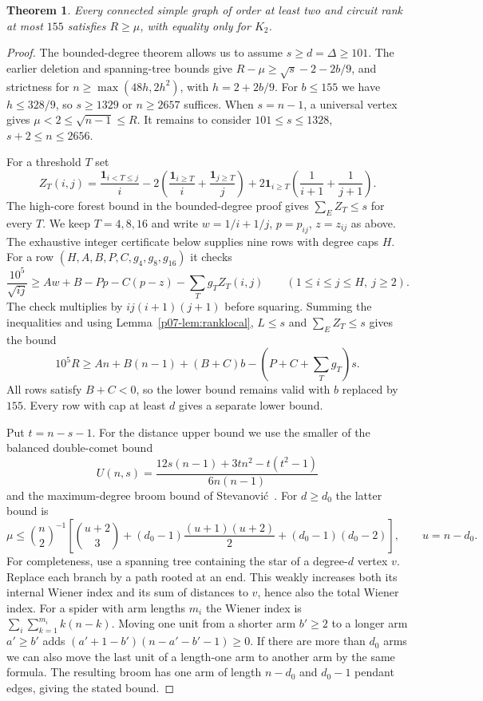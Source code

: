 \documentclass[11pt,a4paper]{article}
\newtheorem{theorem}{Theorem}[section]
\begin{document}
\begin{theorem}\label{p07-thm:cycl155}
Every connected simple graph of order at least two and circuit rank
at most $155$ satisfies $R\ge\mu$, with equality only for $K_2$.
\end{theorem}
\begin{proof}
The bounded-degree theorem allows us to assume $s\ge d=\Delta\ge101$.
The earlier deletion and spanning-tree bounds give
$R-\mu\ge\sqrt{s}-2-2b/9$, and strictness for
$n\ge\max(48h,2h^2)$, with $h=2+2b/9$. For $b\le155$ we have
$h\le328/9$, so $s\ge1329$ or $n\ge2657$ suffices. When $s=n-1$,
a universal vertex gives $\mu<2\le\sqrt{n-1}\le R$.
It remains to consider $101\le s\le1328$, $s+2\le n\le2656$.

For a threshold $T$ set
\[
 Z_T(i,j)=\frac{\mathbf1_{i<T\le j}}i
 -2\left(\frac{\mathbf1_{i\ge T}}i+\frac{\mathbf1_{j\ge T}}j\right)
 +2\mathbf1_{i\ge T}\left(\frac1{i+1}+\frac1{j+1}\right).
\]
The high-core forest bound in the bounded-degree proof gives
$\sum_E Z_T\le s$ for every $T$. We keep $T=4,8,16$ and
write $w=1/i+1/j$, $p=p_{ij}$, $z=z_{ij}$ as above.
The exhaustive integer certificate below supplies nine rows with degree
caps $H$. For a row $(H,A,B,P,C,g_4,g_8,g_{16})$ it checks
\[
 \frac{10^5}{\sqrt{ij}}\ge
 Aw+B-Pp-C(p-z)-\sum_T g_T Z_T(i,j)
 \qquad(1\le i\le j\le H,\ j\ge2).
\]
The check multiplies by $ij(i+1)(j+1)$ before squaring.
Summing the inequalities and using Lemma~\ref{p07-lem:ranklocal},
$L\le s$ and $\sum_E Z_T\le s$ gives the bound
\[
 10^5R\ge An+B(n-1)+(B+C)b-(P+C+\textstyle\sum_Tg_T)s .
\]
All rows satisfy $B+C<0$, so the lower bound remains valid with
$b$ replaced by $155$. Every row with cap at least $d$ gives a separate
lower bound.

Put $t=n-s-1$. For the distance upper bound we use the smaller
of the balanced double-comet bound
\[
 U(n,s)=\frac{12s(n-1)+3tn^2-t(t^2-1)}{6n(n-1)}
\]
and the maximum-degree broom bound of Stevanovi\'c~\cite{p07-Stev}.
For $d\ge d_0$ the latter bound is
\[
 \mu\le\binom n2^{-1}\left[
   \binom{u+2}{3}+(d_0-1)\frac{(u+1)(u+2)}2+(d_0-1)(d_0-2)\right],
 \qquad u=n-d_0 .
\]
For completeness, use a spanning tree containing the star of a
degree-$d$ vertex $v$. Replace each branch by a path rooted at an end.
This weakly increases both its internal Wiener index and its sum of
distances to $v$, hence also the total Wiener index. For a spider with
arm lengths $m_i$ the Wiener index is $\sum_i\sum_{k=1}^{m_i}k(n-k)$.
Moving one unit from a shorter arm $b'\ge2$ to a longer arm $a'\ge b'$
adds $(a'+1-b')(n-a'-b'-1)\ge0$. If there are more than $d_0$ arms
we can also move the last unit of a length-one arm to another arm by
the same formula. The resulting broom has one arm of length $n-d_0$
and $d_0-1$ pendant edges, giving the stated bound.


\end{proof}
\end{document}

